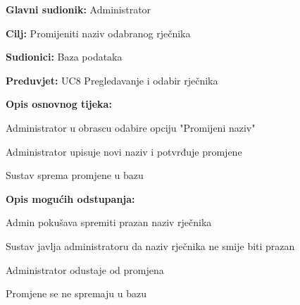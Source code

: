 \noindent {}
\begin{packed_item}

	\item \textbf{Glavni sudionik: } Administrator
	\item \textbf{Cilj: } Promijeniti naziv odabranog rječnika
	\item \textbf{Sudionici: } Baza podataka
	\item \textbf{Preduvjet: } UC8 Pregledavanje i odabir rječnika
	\item  \textbf{Opis osnovnog tijeka:}
	
	\item[] \begin{packed_enum}
		
		\item Administrator u obrascu odabire opciju "Promijeni naziv"
		\item Administrator upisuje novi naziv i potvrđuje promjene
		\item Sustav sprema promjene u bazu

	\end{packed_enum}

	\item  \textbf{Opis mogućih odstupanja:}
	
	\item[] \begin{packed_item}

		\item[2.a] Admin pokušava spremiti prazan naziv rječnika
		\item[] \begin{packed_enum}
			
			\item Sustav javlja administratoru da naziv rječnika ne smije biti prazan
			
		\end{packed_enum}

		\item[2.b] Administrator odustaje od promjena
		\item[] \begin{packed_enum}
			
			\item Promjene se ne spremaju u bazu
			
		\end{packed_enum}
		
	\end{packed_item}

\end{packed_item}


